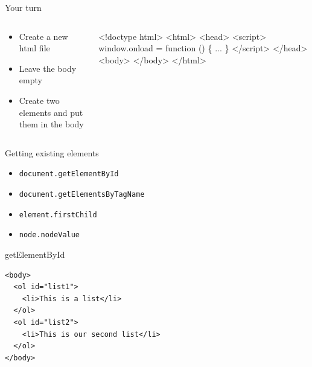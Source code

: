 \documentclass{beamer}
\begin{document}
\begin{frame}[fragile]{Your turn}
\begin{columns}[T]

\begin{column}{0.3\columnwidth}
  \begin{block}{}
    \begin{itemize}
      \item Create a new html file
      \item Leave the body empty
      \item Create two elements and put them in the body
    \end{itemize}
  \end{block}
\end{column}

\begin{column}{0.65\columnwidth}
\begin{block}{}
  \begin{semiverbatim}
<!doctype html>
<html>
  <head>
    <script>
      window.onload = function () \{
        ...
      \}
    </script>
  </head>
  <body>
  </body>
</html>
  \end{semiverbatim}
\end{block}
\end{column}
\end{columns}
\end{frame}


\begin{frame}[fragile]{Getting existing elements}
  \begin{block}{}
    \begin{itemize}
    \item \texttt{document.getElementById} \pause
    \item \texttt{document.getElementsByTagName} \pause
    \item \texttt{element.firstChild} \pause
    \item \texttt{node.nodeValue}
    \end{itemize}
  \end{block}
\end{frame}

\begin{frame}[fragile]{getElementById}
\begin{block}{}
 \begin{verbatim}
<body>
  <ol id="list1">
    <li>This is a list</li>
  </ol>
  <ol id="list2">
    <li>This is our second list</li>
  </ol>
</body>
\end{verbatim}
\end{block}
\end{frame}
\end{document}

